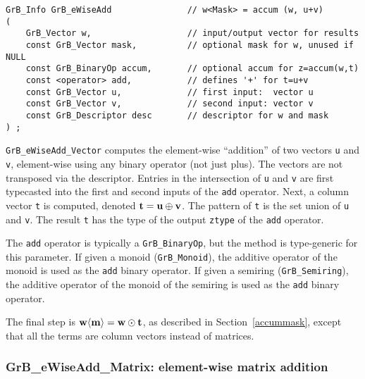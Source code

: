 \documentclass[12pt]{article}
\begin{document}
\begin{mdframed}[userdefinedwidth=6in]
{\footnotesize
\begin{verbatim}
GrB_Info GrB_eWiseAdd               // w<Mask> = accum (w, u+v)
(
    GrB_Vector w,                   // input/output vector for results
    const GrB_Vector mask,          // optional mask for w, unused if NULL
    const GrB_BinaryOp accum,       // optional accum for z=accum(w,t)
    const <operator> add,           // defines '+' for t=u+v
    const GrB_Vector u,             // first input:  vector u
    const GrB_Vector v,             // second input: vector v
    const GrB_Descriptor desc       // descriptor for w and mask
) ;
\end{verbatim} } \end{mdframed}

\verb'GrB_eWiseAdd_Vector' computes the element-wise ``addition'' of two
vectors \verb'u' and \verb'v', element-wise using any binary operator (not just
plus).  The vectors are not transposed via the descriptor.  Entries in the
intersection of \verb'u' and \verb'v' are first typecasted into the first and
second inputs of the \verb'add' operator.  Next, a column vector \verb't' is
computed, denoted ${\bf t = u \oplus v}$.  The pattern of \verb't' is the set
union of \verb'u' and \verb'v'.  The result \verb't' has the type of the output
\verb'ztype' of the \verb'add' operator.

The \verb'add' operator is typically a \verb'GrB_BinaryOp', but the method is
type-generic for this parameter.  If given a monoid (\verb'GrB_Monoid'), the
additive operator of the monoid is used as the \verb'add' binary operator.  If
given a semiring (\verb'GrB_Semiring'), the additive operator of the monoid of
the semiring is used as the \verb'add' binary operator.

The final step is ${\bf w \langle m \rangle  = w \odot t}$, as described in
Section~\ref{accummask}, except that all the terms are column vectors instead
of matrices.

\subsubsection{{\sf GrB\_eWiseAdd\_Matrix:} element-wise matrix addition}
\label{eWiseAdd_matrix}
\end{document}
